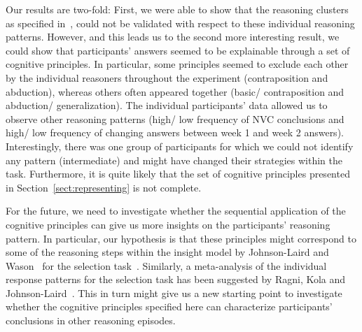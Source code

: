 \documentclass[12pt]{article}
\begin{document}
Our results are two-fold: First, we were able to show that the reasoning clusters as specified in~\cite{declare:2017}, could not be validated
with respect to these individual reasoning patterns. However, and this leads us to the second more interesting result,
we could show that participants' answers seemed to be explainable through a set of cognitive principles. In particular,
some principles seemed to exclude each other by the individual reasoners throughout the experiment (contraposition and abduction), whereas others often appeared together (basic/ contraposition and abduction/ generalization). 
The individual participants' data allowed us to observe other reasoning patterns (high/ low frequency of NVC conclusions and high/ low frequency of changing answers between week 1 and week 2 answers). 
Interestingly, there was one group of participants for which we could not identify any pattern (intermediate)
and might have changed their strategies within the task.
Furthermore, it is quite likely that the set of cognitive principles presented in Section~\ref{sect:representing} is not complete.

For the future, we need to investigate whether the sequential application of the cognitive principles 
can give us more insights on the participants' reasoning pattern. In particular, our hypothesis is that these principles might correspond to some of the reasoning steps within the insight model
by Johnson-Laird and Wason~\cite{johnsonlaird:1970} for the selection task~\cite{wason:68}. Similarly, a meta-analysis of the individual response patterns for the selection task has been suggested by Ragni, Kola and Johnson-Laird~\cite{ragni:2017}.
This in turn might give us a new starting point to investigate whether the cognitive principles  specified here can characterize participants' conclusions in other reasoning episodes.






\end{document}
